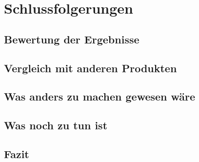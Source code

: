 \chapter{Schlussfolgerungen}

\section{Bewertung der Ergebnisse}

\section{Vergleich mit anderen Produkten}

\section{Was anders zu machen gewesen wäre}

\section{Was noch zu tun ist}

\section{Fazit}
